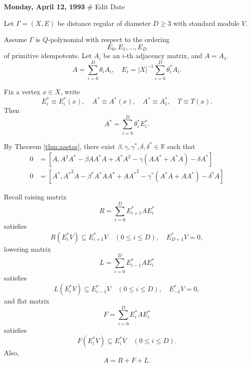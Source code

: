 \documentclass[
]{book}
\theoremstyle{definition}
\theoremstyle{definition}
\theoremstyle{definition}
\theoremstyle{definition}
\theoremstyle{remark}
\begin{document}
\textbf{Monday, April 12, 1993} \# Edit Date

Let \(\Gamma = (X, E)\) be distance regular of diameter \(D\geq 3\) with standard module \(V\).

Assume \(\Gamma\) is \(Q\)-polynomial with respect to the ordering
\[E_0, E_1, \ldots, E_D\]
of primitive idempotents. Let \(A_i\) be an \(i\)-th adjacency matrix, and \(A = A_1\).
\[A = \sum_{i=0}^D\theta_i A_i, \quad E_i = |X|^{-1}\sum_{i=0}^D\theta^*_i A_i.\]

Fix a vertex \(x\in X\), write
\[E^*_i \equiv E^*_i(x), \quad A^*\equiv A^*(x), \quad A^* \equiv A^*_1, \quad T\equiv T(x).\]
Then
\[A^* = \sum_{i=0}^D \theta^*_i E^*_i.\]

By Theorem \ref{thm:aastar}, there exist \(\beta, \gamma, \gamma^*, \delta, \delta^*\in \mathbb{R}\) such that
\begin{align}
0 & = [A, A^2A^*-\beta AA^*A + A^*A^2 - \gamma(AA^*+A^*A) - \delta A^*]\\
0 & = [A^*, {A^*}^2A-\beta^* A^*AA^* + A{A^*}^2 - \gamma^*(A^*A+AA^*) - \delta^* A]
\end{align}

Recall raising matrix
\[R = \sum_{i=0}^D E^*_{i+1}AE^*_i\]
satisfies
\[R(E^*_iV) \subseteq E^*_{i+1}V \quad (0\leq i\leq D), \quad E^*_{D+1}V = 0,\]
lowering matrix
\[L = \sum_{i=0}^D E^*_{i-1}AE^*_i\]
satisfies
\[L(E^*_iV) \subseteq E^*_{i-1}V \quad (0\leq i\leq D), \quad E^*_{-1}V = 0,\]
and flat matrix
\[F = \sum_{i=0}^D E^*_{i}AE^*_i\]
satisfies
\[F(E^*_iV) \subseteq E^*_{i}V \quad (0\leq i\leq D).\]
Also,
\[A = R + F + L.\]
\end{document}
